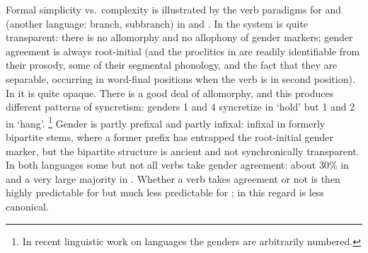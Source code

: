 \documentclass[output=collectionpaper]{langsci/langscibook}
\begin{document}
\largerpage
Formal simplicity vs.\ complexity is illustrated by the verb paradigms for  and  (another  language:  branch,  subbranch) in  and . In  the system is quite transparent: there is no allomorphy and no allophony of gender markers; gender agreement is always root-initial (and the proclitics in  are readily identifiable from their prosody, some of their segmental phonology, and the fact that they are separable, occurring in word-final positions when the verb is in second position). In  it is quite opaque. There is a good deal of allomorphy, and this produces different patterns of syncretism: genders 1 and 4 syncretize in `hold' but 1 and 2 in `hang'.%
\footnote{%
In recent linguistic work on  languages the genders are arbitrarily numbered.
} %
Gender is partly prefixal and partly infixal: infixal in formerly bipartite stems, where a former prefix has entrapped the root-initial gender marker, but the bipartite structure is ancient and not synchronically transparent. In both languages some but not all verbs take gender agreement: about 30\% in  and a very large majority in . Whether a verb takes agreement or not is then highly predictable for  but much less predictable for ; in this regard  is less canonical.
\end{document}
